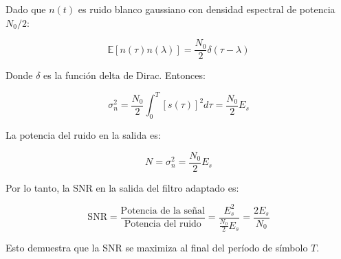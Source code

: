 \documentclass{article}
\begin{document}
Dado que \( n(t) \) es ruido blanco gaussiano con densidad espectral de potencia \( N_0/2 \):

\begin{equation}
\mathbb{E}[n(\tau) n(\lambda)] = \frac{N_0}{2} \delta(\tau - \lambda)
\end{equation}

Donde \( \delta \) es la función delta de Dirac. Entonces:

\begin{equation}
\sigma_n^2 = \frac{N_0}{2} \int_{0}^{T} [s(\tau)]^2 d\tau = \frac{N_0}{2} E_s
\end{equation}

La potencia del ruido en la salida es:

\begin{equation}
N = \sigma_n^2 = \frac{N_0}{2} E_s
\end{equation}

Por lo tanto, la SNR en la salida del filtro adaptado es:

\begin{equation}
\text{SNR} = \frac{\text{Potencia de la señal}}{\text{Potencia del ruido}} = \frac{E_s^2}{\frac{N_0}{2} E_s} = \frac{2 E_s}{N_0}
\end{equation}

Esto demuestra que la SNR se maximiza al final del período de símbolo \( T \).
\end{document}
